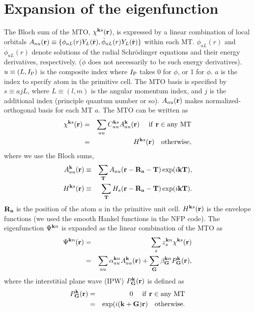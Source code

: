 \documentclass[a4paper,10pt,epsf,fleqn]{article}
\begin{document}
\section{Expansion of the eigenfunction}
The Bloch sum of the MTO, $\chi^{{\bf k}s}({\bf r})$, is 
expressed by a linear combination of local orbitals
$A_{au}({\bf r})
\equiv \{ \phi_{aL}(r) Y_L(\hat{\bf r}),\dot{\phi}_{aL}(r) Y_L(\hat{\bf r}) \}$
within each MT.
$\phi_{aL}(r)$ and $\dot{\phi}_{aL}(r)$ denote solutions of
the radial Schr\"odinger equations and their energy derivatives, respectively.
($\dot{\phi}$ does not necessarily to be such energy derivatives).
$u \equiv(L, I_{\rm P})$ is the composite index
where $I_{\rm P}$ takes 0 for $\phi$, or 1 for $\dot{\phi}$.
$a$ is the index to specify atom in the primitive cell.
The MTO basis is specified by $s \equiv {ajL}$, where
$L\equiv(l,m)$ is the angular momentum index, and $j$ is the additional
index (principle quantum number or so). 
$A_{au}({\bf r})$ makes normalized-orthogonal basis for each MT $a$.
The MTO can be written as
\begin{eqnarray}
\label{coeff}
\chi^{{\bf k}s}({\bf r}) &=& \sum_{a u} C^{{\bf k}s}_{a u} A^{\bf k}_{a u}({\bf r})   \ \ \ {\rm \ if \ {\bf r} \in any \ MT} \nonumber \\
        &=&   H^{{\bf k}s}({\bf r}) \ \ \ {\rm otherwise},
\end{eqnarray}
where we use the Bloch sums,
\begin{eqnarray}
A^{\bf k}_{a u}({\bf r}) &\equiv& \sum_{\bf T} A_{a u}({\bf r-R_a-T}) \exp(i {\bf kT}), \\
H^{{\bf k}s}({\bf r})   &\equiv& \sum_{\bf T} H_{s}({\bf r-R_a-T}) \exp(i {\bf kT}).
\end{eqnarray}
${\bf R_a}$ is the position of the atom $a$ in the primitive unit cell.
$H^{{\bf k}s}({\bf r})$ is the envelope functions (we used the smooth Hankel functions in the NFP code).
The eigenfunction $\Psi^{{\bf k}n}$ is expanded as the linear combination of the MTO as
\begin{eqnarray}
\label{eigenfunction}
\Psi^{{\bf k}n}({\bf r}) &=& \sum_s z^{{\bf k}n}_s \chi^{{\bf k}s}({\bf r}) \\
&=& \sum_{a u} \alpha^{{\bf k} n}_{au} A^{\bf k}_{a u}({\bf r})
 + \sum_{\bf G} \beta^{{\bf k}n}_{\bf G} P^{\bf k}_{\bf G}({\bf r}),
\end{eqnarray}
where the interstitial plane wave (IPW) $P^{\bf k}_{\bf G}({\bf r})$ 
is defined as
\begin{eqnarray}
P^{\bf k}_{\bf G}({\bf r}) &=& 0  \ \ \ {\rm \ if \ {\bf r} \in any \ MT} \nonumber \\
        &=&   \exp (i ({\bf k+G}) {\bf r}) \ \ \ {\rm otherwise}.
\end{eqnarray}
\end{document}
